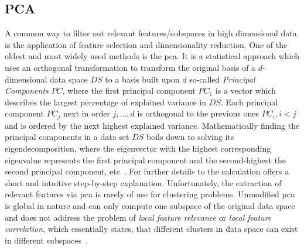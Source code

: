 \subsection{PCA}
A common way to filter out relevant features/subspaces in high dimensional data is the application of feature selection and dimensionality reduction. One of the oldest and most widely used methods is the \gls{pca}. It is a statistical approach which uses an orthogonal transformation to transform the original basis of a $d$-dimensional data space $DS$ to a basis built upon $d$ so-called \textit{Principal Components} $PC$, where the first principal component $PC_1$ is a vector which describes the largest percentage of explained variance in $DS$. Each principal component $PC_j$ next in order $j,\dotsc,d$ is orthogonal to the previous ones $PC_i, i<j$ and is ordered by the next highest explained variance. Mathematically finding the principal components in a data set $DS$ boils down to solving its eigendecomposition, 
where the eigenvector with the highest corresponding eigenvalue represents the first principal component and the second-highest the second principal component, etc~\cite{pcawold1987principal}. For further details to the calculation \textcite{pcamljolliffe1986principal} offers a short and intuitive step-by-step explanation.
Unfortunately, the extraction of relevant features via \gls{pca} is rarely of use for clustering problems. Unmodified \gls{pca} is global in nature and can only compute one subspace of the original data space and does not address the problem of \textit{local feature relevance} or \textit{local feature correlation}, which essentially states, that different clusters in data space can exist in different subspaces~\cite{kriegel2009clustering, PCAshlens2014tutorial}. 

